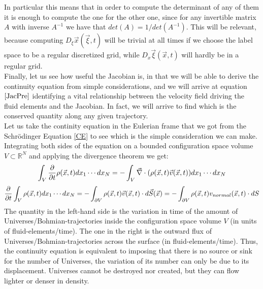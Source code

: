 \documentclass[11pt, a4paper]{article} %
\newcommand{\R}{\mathbb{R}} %
\DeclareRobustCommand{\mybox}[2][gray!20]{%
\begin{tcolorbox}[   %
        left=1cm,
        right=1cm,
        top=0.5cm,
        bottom=0.5cm,
        colback=#1,
        colframe=#1,
        width=\dimexpr\textwidth\relax, 
        enlarge left by=0mm,
        boxsep=5pt,
        arc=0pt,outer arc=0pt,
        ]
        #2
\end{tcolorbox}
}
\begin{document}
\mybox{
In particular this means that in order to compute the determinant of any of them it is enough to compute the one for the other one, since for any invertible matrix $A$ with inverse $A^{-1}$ we have that $det(A)=1/det(A^{-1})$. This will be relevant, because computing $D_\xi \vec{x}(\vec{\xi},t)$ will be trivial at all times if we choose the label space to be a regular discretized grid, while $D_x \vec{\xi}(\vec{x},t)$ will hardly be in a regular grid.\\

Finally, let us see how useful the Jacobian is, in that we will be able to derive the continuity equation from simple considerations, and we will arrive at equation $\eqref{JacPre}$ identifying a vital relationship between the velocity field driving the fluid elements and the Jacobian. In fact, we will arrive to find which is the conserved quantity along any given trajectory.\\

Let us take the continity equation in the Eulerian frame that we got from the Schrödinger Equation \eqref{CE} to see which is the simple consideration we can make. Integrating both sides of the equation on a bounded configuration space volume $V\subset\R^N$ and applying the divergence theorem we get:
$$
\int_{V}\pdv{}{t} \rho(\vec{x},t) dx_1\cdots dx_N=-\int_{V}\vec{\nabla}\cdot \qty( \rho(\vec{x},t)\vec{v}(\vec{x},t) )dx_1\cdots dx_N
$$
\begin{equation}
\pdv{}{t} \int_{V} \rho(\vec{x},t) dx_1\cdots dx_N=-\int_{\partial V} \rho(\vec{x},t)\vec{v}(\vec{x},t)\cdot d\vec{S}(\vec{x})=-\int_{\partial V} \rho(\vec{x},t)v_{normal}(\vec{x},t)\cdot dS
\end{equation}
The quantity in the left-hand side is the variation in time of the amount of Universes/Bohmian-trajectories inside the configuration space volume $V$ (in units of fluid-elements/time). The one in the right is the outward flux of Universes/Bohmian-trajectories across the surface (in fluid-elements/time). Thus, the continuity equation is equivalent to imposing that there is no source or sink for the number of Universes, the variation of its number can only be due to its displacement. Universes cannot be destroyed nor created, but they can flow lighter or denser in density.\\

}
\end{document}
